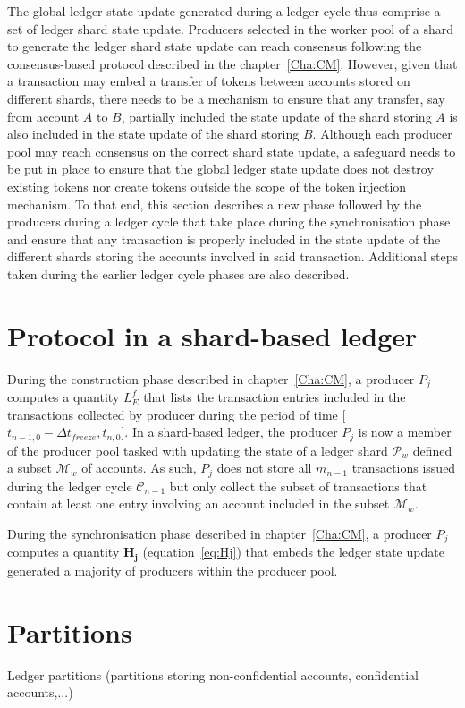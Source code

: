 The global ledger state update generated during a ledger cycle thus comprise a set of ledger shard state update. Producers selected in the worker pool of a shard to generate the ledger shard state update can reach consensus following the consensus-based protocol described in the chapter~\ref{Cha:CM}. However, given that a transaction may embed a transfer of tokens between accounts stored on different shards, there needs to be a mechanism to ensure that any transfer, say from account $A$ to $B$, partially included the state update of the shard storing $A$ is also included in the state update of the shard storing $B$. Although each producer pool may reach consensus on the correct shard state update, a safeguard needs to be put in place to ensure that the global ledger state update does not destroy existing tokens nor create tokens outside the scope of the token injection mechanism. To that end, this section describes a new phase followed by the producers during a ledger cycle that take place during the synchronisation phase and ensure that any transaction is properly included in the state update of the different shards storing the accounts involved in said transaction.  Additional steps taken during the earlier ledger cycle phases are also described.

\section{Protocol in a shard-based ledger}

During the construction phase described in chapter~\ref{Cha:CM}, a producer $P_j$ computes a quantity $L_E^f$ that lists the transaction entries included in the transactions collected by producer during the period of time [$t_{n-1,0} - \Delta t_{freeze}, t_{n,0}$]. In a shard-based ledger, the producer $P_j$ is now a member of the producer pool tasked with updating the state of a ledger shard $\mathcal{P}_w$ defined a subset $\mathcal{M}_w$ of accounts. As such, $P_j$ does not store all $m_{n-1}$ transactions issued during the ledger cycle $\mathcal{C}_{n-1}$ but only collect the subset of transactions that contain at least one entry involving  an account included in the subset $\mathcal{M}_w$.


During the synchronisation phase described in chapter~\ref{Cha:CM}, a producer $P_j$ computes a quantity $\mathbf{H_{j}}$ (equation~\eqref{eq:Hj})  that embeds the ledger state update generated a majority of producers within the producer pool. 

\section{Partitions}

Ledger partitions (partitions storing non-confidential accounts, confidential accounts,...)
